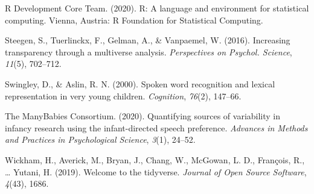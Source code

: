 \documentclass[10pt, letterpaper]{article}
\begin{document}
\leavevmode\hypertarget{ref-RDevelopmentCoreTeam2010}{}%
R Development Core Team. (2020). R: A language and environment for
statistical computing. Vienna, Austria: R Foundation for Statistical
Computing.

\leavevmode\hypertarget{ref-steegenEtAl2016}{}%
Steegen, S., Tuerlinckx, F., Gelman, A., \& Vanpaemel, W. (2016).
Increasing transparency through a multiverse analysis.
\emph{Perspectives on Psychol. Science}, \emph{11}(5), 702--712.

\leavevmode\hypertarget{ref-Swingley2000}{}%
Swingley, D., \& Aslin, R. N. (2000). Spoken word recognition and
lexical representation in very young children. \emph{Cognition},
\emph{76}(2), 147--66.

\leavevmode\hypertarget{ref-TheManyBabiesConsortium2020}{}%
The ManyBabies Consortium. (2020). Quantifying sources of variability in
infancy research using the infant-directed speech preference.
\emph{Advances in Methods and Practices in Psychological Science},
\emph{3}(1), 24--52.

\leavevmode\hypertarget{ref-Wickham2019}{}%
Wickham, H., Averick, M., Bryan, J., Chang, W., McGowan, L. D.,
François, R., \ldots{} Yutani, H. (2019). Welcome to the tidyverse.
\emph{Journal of Open Source Software}, \emph{4}(43), 1686.


\end{document}
